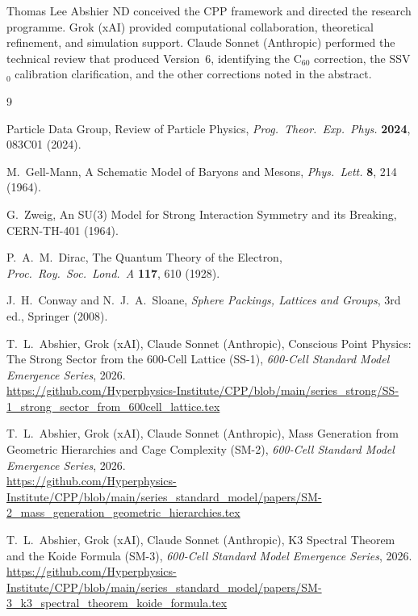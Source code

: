 \documentclass[11pt]{article}
\begin{document}
Thomas Lee Abshier ND conceived the CPP framework and directed the
research programme.  Grok (xAI) provided computational collaboration,
theoretical refinement, and simulation support.  Claude Sonnet (Anthropic)
performed the technical review that produced Version~6, identifying the
C$_{60}$ correction, the SSV$_0$ calibration clarification, and the other
corrections noted in the abstract.

\begin{thebibliography}{9}

Particle Data Group,
Review of Particle Physics,
\textit{Prog.\ Theor.\ Exp.\ Phys.} \textbf{2024}, 083C01 (2024).

M.~Gell-Mann,
A Schematic Model of Baryons and Mesons,
\textit{Phys.\ Lett.} \textbf{8}, 214 (1964).

G.~Zweig,
An SU(3) Model for Strong Interaction Symmetry and its Breaking,
CERN-TH-401 (1964).

P.~A.~M.~Dirac,
The Quantum Theory of the Electron,
\textit{Proc.\ Roy.\ Soc.\ Lond.\ A} \textbf{117}, 610 (1928).

J.~H.~Conway and N.~J.~A.~Sloane,
\textit{Sphere Packings, Lattices and Groups}, 3rd ed.,
Springer (2008).

T.~L.~Abshier, Grok (xAI), Claude Sonnet (Anthropic),
Conscious Point Physics: The Strong Sector from the 600-Cell Lattice (SS-1),
\textit{600-Cell Standard Model Emergence Series}, 2026.\\
\url{https://github.com/Hyperphysics-Institute/CPP/blob/main/series_strong/SS-1_strong_sector_from_600cell_lattice.tex}

T.~L.~Abshier, Grok (xAI), Claude Sonnet (Anthropic),
Mass Generation from Geometric Hierarchies and Cage Complexity (SM-2),
\textit{600-Cell Standard Model Emergence Series}, 2026.\\
\url{https://github.com/Hyperphysics-Institute/CPP/blob/main/series_standard_model/papers/SM-2_mass_generation_geometric_hierarchies.tex}

T.~L.~Abshier, Grok (xAI), Claude Sonnet (Anthropic),
K3 Spectral Theorem and the Koide Formula (SM-3),
\textit{600-Cell Standard Model Emergence Series}, 2026.\\
\url{https://github.com/Hyperphysics-Institute/CPP/blob/main/series_standard_model/papers/SM-3_k3_spectral_theorem_koide_formula.tex}


\end{thebibliography}
\end{document}
